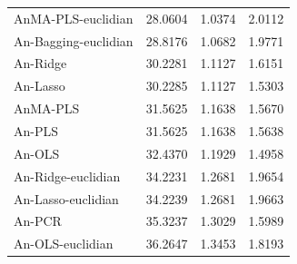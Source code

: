 \documentclass[journal, twoside]{IEEEtran}
\begin{document}
\begin{table}
\begin{tabular}{lrrr}
            AnMA-PLS-euclidian &  28.0604 & 1.0374 &  2.0112 \\
             An-Bagging-euclidian &  28.8176 & 1.0682 &  1.9771 \\
                An-Ridge &  30.2281 & 1.1127 &  1.6151 \\
                An-Lasso &  30.2285 & 1.1127 &  1.5303 \\
                AnMA-PLS &  31.5625 & 1.1638 &  1.5670 \\
                  An-PLS &  31.5625 & 1.1638 &  1.5638 \\
                  An-OLS &  32.4370 & 1.1929 &  1.4958 \\
            An-Ridge-euclidian &  34.2231 & 1.2681 &  1.9654 \\
            An-Lasso-euclidian &  34.2239 & 1.2681 &  1.9663 \\
                  An-PCR &  35.3237 & 1.3029 &  1.5989 \\
              An-OLS-euclidian &  36.2647 & 1.3453 &  1.8193 \\  %
\hline
\end{tabular}
\end{table}
\end{document}
